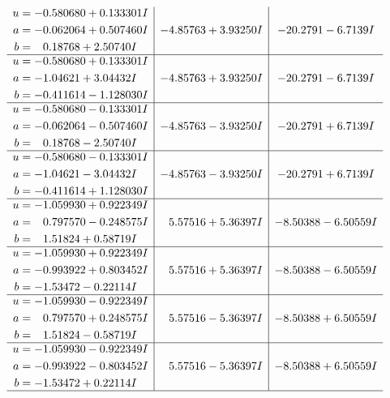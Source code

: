 \documentclass[1p]{elsarticle_modified}
\theoremstyle{definition}
\begin{document}
$$\begin{array}{c|c|c}
\begin{aligned}
u &= -0.580680 + 0.133301 I \\
a &= -0.062064 + 0.507460 I \\
b &= \phantom{-}0.18768 + 2.50740 I\end{aligned}
 & -4.85763 + 3.93250 I & -20.2791 - 6.7139 I \\ \hline\begin{aligned}
u &= -0.580680 + 0.133301 I \\
a &= -1.04621 + 3.04432 I \\
b &= -0.411614 - 1.128030 I\end{aligned}
 & -4.85763 + 3.93250 I & -20.2791 - 6.7139 I \\ \hline\begin{aligned}
u &= -0.580680 - 0.133301 I \\
a &= -0.062064 - 0.507460 I \\
b &= \phantom{-}0.18768 - 2.50740 I\end{aligned}
 & -4.85763 - 3.93250 I & -20.2791 + 6.7139 I \\ \hline\begin{aligned}
u &= -0.580680 - 0.133301 I \\
a &= -1.04621 - 3.04432 I \\
b &= -0.411614 + 1.128030 I\end{aligned}
 & -4.85763 - 3.93250 I & -20.2791 + 6.7139 I \\ \hline\begin{aligned}
u &= -1.059930 + 0.922349 I \\
a &= \phantom{-}0.797570 - 0.248575 I \\
b &= \phantom{-}1.51824 + 0.58719 I\end{aligned}
 & \phantom{-}5.57516 + 5.36397 I & -8.50388 - 6.50559 I \\ \hline\begin{aligned}
u &= -1.059930 + 0.922349 I \\
a &= -0.993922 + 0.803452 I \\
b &= -1.53472 - 0.22114 I\end{aligned}
 & \phantom{-}5.57516 + 5.36397 I & -8.50388 - 6.50559 I \\ \hline\begin{aligned}
u &= -1.059930 - 0.922349 I \\
a &= \phantom{-}0.797570 + 0.248575 I \\
b &= \phantom{-}1.51824 - 0.58719 I\end{aligned}
 & \phantom{-}5.57516 - 5.36397 I & -8.50388 + 6.50559 I \\ \hline\begin{aligned}
u &= -1.059930 - 0.922349 I \\
a &= -0.993922 - 0.803452 I \\
b &= -1.53472 + 0.22114 I\end{aligned}
 & \phantom{-}5.57516 - 5.36397 I & -8.50388 + 6.50559 I\\
 \hline 
 \end{array}$$\newpage\newpage\renewcommand{\arraystretch}{1}
\end{document}
